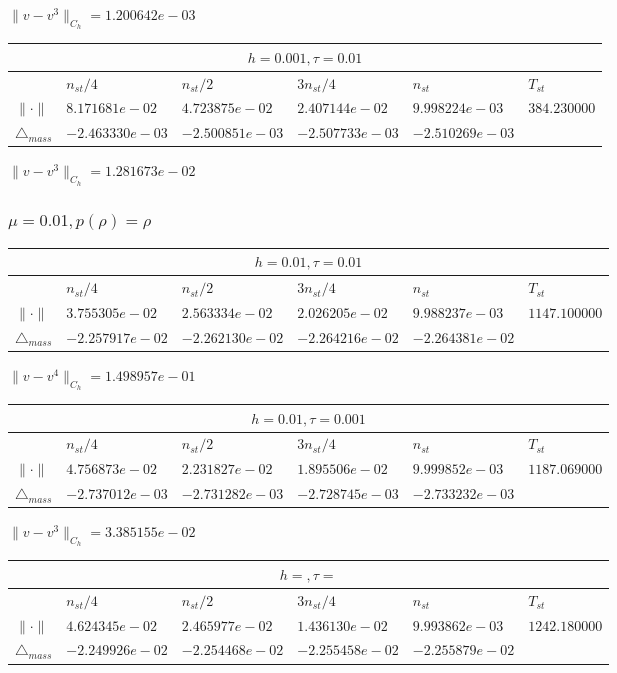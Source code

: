 $\|v-v^{3}\|_{C_h} = 1.200642e-03$

\begin{tabular}{*{6}{|l}|}
    \hline
     \\
    \hline
    &$n_{st}/4 $&$ n_{st}/2$&$3n_{st}/4$&$n_{st}$&$T_{st}$ \\
    \hline
$\|\cdot \|$& $8.171681e-02$ & $4.723875e-02$ & $2.407144e-02$ & $9.998224e-03$ &$384.230000$\\
\hline
$\triangle_{mass}$& $-2.463330e-03$ & $-2.500851e-03$ & $-2.507733e-03$ & $-2.510269e-03$ &\\
\hline  
\end{tabular}

$\|v-v^{3}\|_{C_h} = 1.281673e-02$

\subsubsection{$\mu = 0.01, p(\rho) = \rho $}

\begin{tabular}{*{6}{|l}|}
    \hline
     \\
    \hline
    &$n_{st}/4 $&$ n_{st}/2$&$3n_{st}/4$&$n_{st}$&$T_{st}$ \\
    \hline
$\|\cdot \|$& $3.755305e-02$ & $2.563334e-02$ & $2.026205e-02$ & $9.988237e-03$ &$1147.100000$\\
\hline
$\triangle_{mass}$& $-2.257917e-02$ & $-2.262130e-02$ & $-2.264216e-02$ & $-2.264381e-02$ &\\
\hline
\end{tabular}

$\|v-v^{4}\|_{C_h} = 1.498957e-01$

\begin{tabular}{*{6}{|l}|}
    \hline
     \\
    \hline
    &$n_{st}/4 $&$ n_{st}/2$&$3n_{st}/4$&$n_{st}$&$T_{st}$ \\
    \hline
    $\|\cdot \|$& $4.756873e-02$ & $2.231827e-02$ & $1.895506e-02$ & $9.999852e-03$ &$1187.069000$\\
\hline
$\triangle_{mass}$& $-2.737012e-03$ & $-2.731282e-03$ & $-2.728745e-03$ & $-2.733232e-03$ &\\
\hline
\end{tabular}

$\|v-v^{3}\|_{C_h} = 3.385155e-02$

\begin{tabular}{*{6}{|l}|}
    \hline
     \\
    \hline
    &$n_{st}/4 $&$ n_{st}/2$&$3n_{st}/4$&$n_{st}$&$T_{st}$ \\
    \hline
    $\|\cdot \|$& $4.624345e-02$ & $2.465977e-02$ & $1.436130e-02$ & $9.993862e-03$ &$1242.180000$\\
\hline
$\triangle_{mass}$& $-2.249926e-02$ & $-2.254468e-02$ & $-2.255458e-02$ & $-2.255879e-02$ &\\
\hline
\end{tabular}

